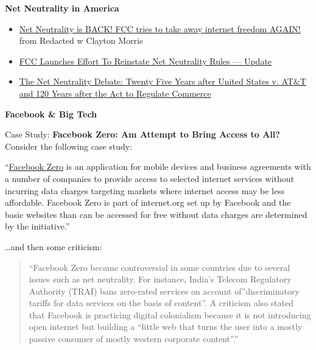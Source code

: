 \documentclass[
]{book}
\providecommand{\tightlist}{%
  \setlength{\itemsep}{0pt}\setlength{\parskip}{0pt}}
\theoremstyle{definition}
\theoremstyle{definition}
\theoremstyle{definition}
\theoremstyle{definition}
\theoremstyle{remark}
\begin{document}
\begin{reflect}
\textbf{Net Neutrality in America}

\begin{itemize}
\tightlist
\item
  \href{https://www.youtube.com/watch?v=DCfWzAM-JeY}{Net Neutrality is BACK! FCC tries to take away internet freedom AGAIN!} from Redacted w Clayton Morris\\
\item
  \href{https://deadline.com/2023/10/net-neutrality-fcc-reinstate-jessica-rosenworcel-1235556493/}{FCC Launches Effort To Reinstate Net Neutrality Rules --- Update}\\
\item
  \href{https://siepr.stanford.edu/publications/working-paper/net-neutrality-debate-twenty-five-years-after-united-states-v-att-and}{The Net Neutrality Debate: Twenty Five Years after United States v. AT\&T and 120 Years after the Act to Regulate Commerce}
\end{itemize}

\textbf{Facebook \& Big Tech}

Case Study: \textbf{Facebook Zero: Am Attempt to Bring Access to All?}\\
Consider the following case study:

``\href{https://en.wikipedia.org/wiki/Facebook_Zero}{Facebook Zero} is an application for mobile devices and business agreements with a number of companies to provide access to selected internet services without incurring data charges targeting markets where internet access may be less affordable. Facebook Zero is part of internet.org set up by Facebook and the basic websites than can be accessed for free without data charges are determined by the initiative.''

\ldots and then some criticism:

\begin{quote}
``Facebook Zero became controversial in some countries due to several issues such as net neutrality. For instance, India's Telecom Regulatory Authority (TRAI) bans zero-rated services on account of''discriminatory tariffs for data services on the basis of content''. A criticism also stated that Facebook is practicing digital colonialism because it is not introducing open internet but building a ``little web that turns the user into a mostly passive consumer of mostly western corporate content''.''
\end{quote}


\end{reflect}
\end{document}
